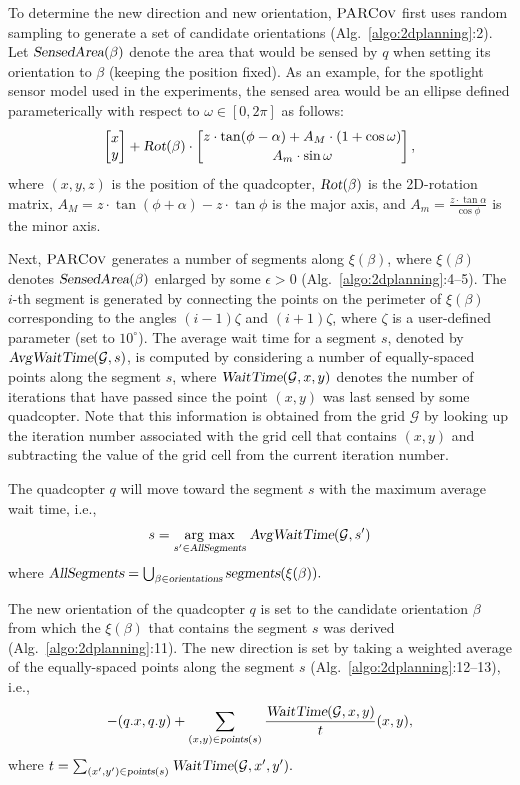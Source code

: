 \documentclass[letterpaper, 10pt, conference]{ieeeconf}
\newcommand{\Symbol}[1]{\ensuremath{\mathcal{#1}}}
\newcommand{\Function}[1]{\ensuremath{{ \textsc{#1}}}}
\newcommand{\Var}[1]{\ensuremath{{{\textsl{#1}}}}}
\newcommand{\Name}{\Function{\small{PARCov}}}
\newcommand{\argmax}[1]{\underset{#1}{\operatorname{arg}\,\operatorname{max}}\;}
\begin{document}
To determine the new direction and new orientation, $\Name$ first uses
random sampling to generate a set of candidate orientations
(Alg.~\ref{algo:2dplanning}:2). Let $\Var{SensedArea}(\beta)$ denote
the area that would be sensed by $q$ when setting its orientation to
$\beta$ (keeping the position fixed). As an example, for the spotlight
sensor model used in the experiments, the sensed area would be an
ellipse defined parameterically with respect to $\omega \in [0, 2\pi]$ as follows:
$$
\begin{bmatrix}
x\\
y
\end{bmatrix} +
\Var{Rot}(\beta) \cdot \begin{bmatrix} z \cdot
    \tan({\phi} - \alpha) +
    A_M \cdot (1 + \cos{\omega})  \\[0.2em]
    A_m \cdot
\sin{\omega} \end{bmatrix},
$$
where $(x, y, z)$ is the position of the quadcopter, $\Var{Rot}(\beta)$ is the 2D-rotation matrix,
$ A_M = z \cdot \tan{(\phi + \alpha)} - z \cdot
\tan{\phi}$ is the major axis, and $A_m = \frac{z \cdot
  \tan{\alpha}}{\cos{\phi}} $ is the minor axis.


Next, $\Name$ generates a number of segments along $\xi(\beta)$, where
$\xi(\beta)$ denotes $\Var{SensedArea}(\beta)$ enlarged by some
$\epsilon > 0$ (Alg.~\ref{algo:2dplanning}:4--5). The $i$-th segment
is generated by connecting the points on the perimeter of $\xi(\beta)$
corresponding to the angles $(i-1)\zeta$ and $(i+1) \zeta$, where
$\zeta$ is a user-defined parameter (set to $10^{\circ}$).  The
average wait time for a segment $s$, denoted by
$\Var{AvgWaitTime}(\Symbol{G}, s)$, is computed by considering a
number of equally-spaced points along the segment $s$, where
$\Var{WaitTime}(\Symbol{G}, x, y)$ denotes the number of iterations
that have passed since the point $(x, y)$ was last sensed by some
quadcopter.  Note that this information is obtained from the grid
$\Symbol{G}$ by looking up the iteration number associated with the
grid cell that contains $(x, y)$ and subtracting the value of the grid
cell from the current iteration number.

The quadcopter $q$ will move toward the segment $s$ with the maximum
average wait time, i.e.,
$$
s = \argmax{s' \in \Var{AllSegments}} \Var{AvgWaitTime}(\Symbol{G}, s')
$$
where
$
\Var{AllSegments} = \bigcup_{\beta \in \Var{orientations}} \Var{segments}(\xi(\beta)).
$

\noindent
The new orientation of the quadcopter $q$ is set to the candidate
orientation $\beta$ from which the $\xi(\beta)$ that contains the segment
$s$ was derived (Alg.~\ref{algo:2dplanning}:11). The new direction is
set by taking a weighted average of the equally-spaced points along
the segment $s$ (Alg.~\ref{algo:2dplanning}:12--13), i.e.,
$$
- (q.x, q.y) + \sum_{(x, y) \in \Var{points}(s)}
\frac{\Var{WaitTime}(\Symbol{G}, x, y)}{t} (x, y),
$$
where
$
t = \sum_{(x', y') \in \Var{points}(s)} \Var{WaitTime}(\Symbol{G}, x', y').
$
\end{document}
